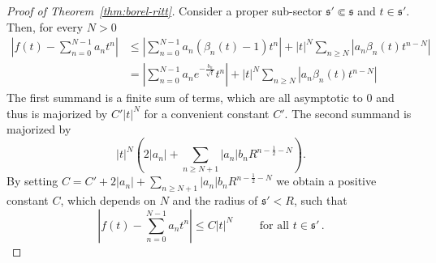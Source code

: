 \begin{proof}[Proof of Theorem~\ref{thm:borel-ritt}]
  Consider a proper sub-sector $\mathfrak{s}'\Subset\mathfrak{s}$ and
  $t\in\mathfrak{s}'$. Then, for every $N>0$
  \begin{align*}
    \left|f(t)-\sum_{n=0}^{N-1} a_nt^n\right|
    &\leq \left| \sum_{n=0}^{N-1}a_n(\beta_n(t)-1)t^n \right|
      +|t|^N\sum_{n\geq N}\left| a_n\beta_n(t)t^{n-N} \right|
  \\&= \left| \sum_{n=0}^{N-1}a_ne^{-\frac{b_n}{\sqrt{t}}}t^n \right|
      +|t|^N\sum_{n\geq N}\left| a_n\beta_n(t)t^{n-N} \right|
  \end{align*}
  The first summand is a finite sum of terms, which are all asymptotic to $0$
  and thus is majorized by $C'|t|^N$ for a convenient constant $C'$.
  The second summand is majorized by
  \[
    |t|^N\left(2|a_n|+\sum_{n\geq N+1}|a_n|b_nR^{n-\frac{1}{2}-N}\right).
  \]
  By setting $C=C'+2|a_n|+\sum_{n\geq N+1}|a_n|b_nR^{n-\frac{1}{2}-N}$ we
  obtain a positive constant $C$, which depends on $N$ and the radius of
  $\mathfrak{s}'<R$, such that
  \[
    \left|f(t)-\sum_{n=0}^{N-1} a_nt^n\right| \leq C|t|^N
    \qquad\text{ for all } t\in\mathfrak{s}' \,.
  \]

\end{proof}

